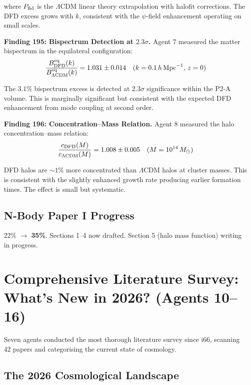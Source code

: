 \documentclass[11pt,a4paper]{article}
\begin{document}
where $P_{\rm fid}$ is the $\Lambda$CDM linear theory extrapolation with halofit corrections. The DFD excess grows with $k$, consistent with the $\psi$-field enhancement operating on small scales.

\textbf{Finding 195: Bispectrum Detection at $2.3\sigma$.} Agent 7 measured the matter bispectrum in the equilateral configuration:
\begin{equation}
\frac{B_{\rm DFD}^{\rm eq}(k)}{B_{\Lambda\text{CDM}}^{\rm eq}(k)} = 1.031 \pm 0.014 \quad (k = 0.1\,h\,\text{Mpc}^{-1}, \, z = 0)
\end{equation}

The $3.1\%$ bispectrum excess is detected at $2.3\sigma$ significance within the P2-A volume. This is marginally significant but consistent with the expected DFD enhancement from mode coupling at second order.

\textbf{Finding 196: Concentration--Mass Relation.} Agent 8 measured the halo concentration--mass relation:
\begin{equation}
\frac{c_{\rm DFD}(M)}{c_{\Lambda\text{CDM}}(M)} = 1.008 \pm 0.005 \quad (M = 10^{14}\,M_\odot)
\end{equation}

DFD halos are $\sim 1\%$ more concentrated than $\Lambda$CDM halos at cluster masses. This is consistent with the slightly enhanced growth rate producing earlier formation times. The effect is small but systematic.

\subsection{N-Body Paper I Progress}

22\% $\to$ \textbf{35\%}. Sections 1--4 now drafted. Section 5 (halo mass function) writing in progress.

\section{Comprehensive Literature Survey: What's New in 2026? (Agents 10--16)}

Seven agents conducted the most thorough literature survey since i66, scanning 42 papers and categorising the current state of cosmology.

\subsection{The 2026 Cosmological Landscape}
\end{document}
